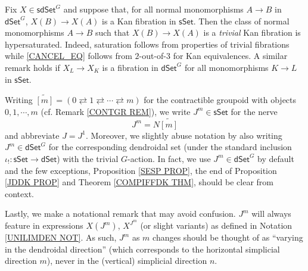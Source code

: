 \documentclass[a4paper,10pt
 ,draft
]{article}%
\begin{document}
\begin{remark}\label{HYPERMODEL REM}
Fix $X \in \mathsf{sdSet}^G$ and suppose that,
for all normal monomorphisms $A\to B$ in $\mathsf{dSet}^G$,
$X(B) \to X(A)$ is a Kan fibration in $\mathsf{sSet}$.
Then the class of normal monomorphisms $A \to B$
such that $X(B) \to X(A)$
is a \emph{trivial} Kan fibration is hypersaturated. 
Indeed, saturation follows from properties of trivial fibrations  while \eqref{CANCEL_EQ} follows from $2$-out-of-$3$ for Kan equivalences.
A similar remark holds if
$X_L \to X_K$ is 
a fibration in $\mathsf{dSet}^G$
for all monomorphisms $K\to L$ in $\mathsf{sSet}$.
\end{remark}







\begin{notation}\label{JM NOT}
Writing
	$\widetilde{[m]} = 
	(0 \rightleftarrows 
	1 \rightleftarrows \cdots
	\rightleftarrows m)$
for the contractible groupoid with objects 
$0,1,\cdots,m$ (cf. Remark \ref{CONTGR REM}),
we write $J^m \in \mathsf{sSet}$ for the nerve
\[
J^m = N \widetilde{[m]}
\]
and abbreviate $J = J^1$.
Moreover, we slightly abuse notation by also writing $J^m \in \mathsf{dSet}^G$ for the corresponding dendroidal set 
(under the standard inclusion $\iota_! \colon \mathsf{sSet} \to \mathsf{dSet}$) with the trivial $G$-action.
In fact, we use $J^m \in \mathsf{dSet}^G$ by default and the few  exceptions,
Proposition \ref{SESP PROP},
the end of
Proposition \ref{JDDK PROP}
and
Theorem \ref{COMPIFFDK THM},
should be clear from context.

Lastly, we make a notational remark that may avoid confusion. $J^m$ will always feature in expressions $X(J^m)$, $X^{J^m}$ (or slight variants) as defined in Notation \ref{UNILIMDEN NOT}. As such, $J^{m}$ as $m$ changes should be thought of as ``varying in the dendroidal direction'' (which corresponds to the horizontal simplicial direction $m$), never in the (vertical) simplicial direction $n$.
\end{notation}
\end{document}
